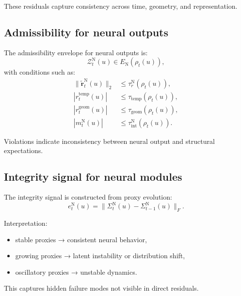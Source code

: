 \documentclass[11pt]{article}
\theoremstyle{definition}
\theoremstyle{plain}
\begin{document}
These residuals capture consistency across time, geometry, and representation.


\subsection{Admissibility for neural outputs}

The admissibility envelope for neural outputs is:
\begin{equation}
\mathcal{Z}^{\mathrm{N}}_t(u)\in E_{\mathrm{N}}(\rho_t(u)),
\end{equation}
with conditions such as:
\begin{align}
\|\tilde{\mathbf r}^{\mathrm{N}}_t(u)\|_2 &\le \tau_r^{\mathrm{N}}(\rho_t(u)),\\
|r^{\mathrm{temp}}_t(u)| &\le \tau_{\mathrm{temp}}(\rho_t(u)),\\
|r^{\mathrm{geom}}_t(u)| &\le \tau_{\mathrm{geom}}(\rho_t(u)),\\
|m^{\mathrm{N}}_t(u)| &\le \tau_{\mathrm{int}}^{\mathrm{N}}(\rho_t(u)).
\end{align}

Violations indicate inconsistency between neural output and structural expectations.


\subsection{Integrity signal for neural modules}

The integrity signal is constructed from proxy evolution:
\begin{equation}
e^{\mathrm{N}}_t(u)=\|\Sigma^{\mathrm{N}}_t(u)-\Sigma^{\mathrm{N}}_{t-1}(u)\|_F.
\end{equation}

Interpretation:
\begin{itemize}[leftmargin=1.5em]
    \item stable proxies → consistent neural behavior,
    \item growing proxies → latent instability or distribution shift,
    \item oscillatory proxies → unstable dynamics.
\end{itemize}

This captures hidden failure modes not visible in direct residuals.
\end{document}
